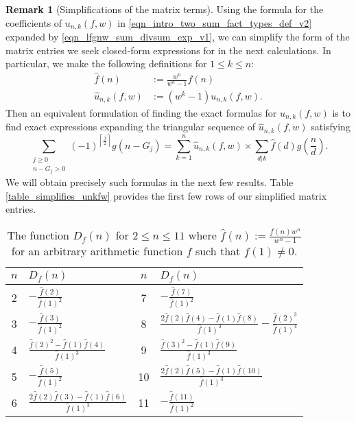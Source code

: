 \documentclass[12pt,reqno,a4letter]{article}
\numberwithin{figure}{section}
\numberwithin{table}{section}
\numberwithin{equation}{section}
\newcommand{\ceiling}[1]{\left\lceil #1 \right\rceil}
\theoremstyle{plain}
\numberwithin{theorem}{section}
\theoremstyle{definition}
\newtheorem{remark}[theorem]{Remark}
\begin{document}
\begin{remark}[Simplifications of the matrix terms] 
\label{remark_simplified_unkfw} 
Using the formula for the coefficients of $u_{n,k}(f, w)$ in 
\eqref{eqn_intro_two_sum_fact_types_def_v2} expanded by 
\eqref{eqn_lfgnw_sum_divsum_exp_v1}, we can simplify the 
form of the matrix entries we seek closed-form expressions for in the next 
calculations. In particular, we make the following definitions for 
$1 \leq k \leq n$: 
\begin{align*} 
\widehat{f}(n) & := \frac{w^n}{w^n-1} f(n) \\ 
\widehat{u}_{n,k}(f, w) & := (w^k - 1) u_{n,k}(f, w). 
\end{align*} 
Then an equivalent formulation of finding the exact formulas for $u_{n,k}(f, w)$ is 
to find exact expressions expanding the triangular sequence of 
$\widehat{u}_{n,k}(f, w)$ satisfying 
\[
\sum_{\substack{j \geq 0 \\ n-G_j > 0}} (-1)^{\ceiling{\frac{j}{2}}} g(n-G_j) = 
     \sum_{k=1}^{n} \widehat{u}_{n,k}(f, w) \times \sum_{d|k} 
     \widehat{f}(d) g\left(\frac{n}{d}\right). 
\] 
We will obtain precisely such formulas in the next few results. 
Table \ref{table_simplifies_unkfw} provides the first few rows of our 
simplified matrix entries. 
\end{remark} 


\begin{table}[ht!] 

\centering
\begin{tabular}{|c|l|c|l|} \hline 
$n$ & $D_f(n)$ & $n$ & $D_f(n)$ \\ \hline 
2 & $-\frac{\widehat{f}(2)}{\widehat{f}(1)^2}$ & 7 & 
    $-\frac{\widehat{f}(7)}{\widehat{f}(1)^2}$ \\ 
3 & $-\frac{\widehat{f}(3)}{\widehat{f}(1)^2}$ & 8 & 
    $\frac{2 \widehat{f}(2) \widehat{f}(4)-\widehat{f}(1)
    \widehat{f}(8)}{\widehat{f}(1)^3}-\frac{\widehat{f}(2)^3}{\widehat{f}(1)^4}$ \\ 
4 & $\frac{\widehat{f}(2)^2-\widehat{f}(1)
    \widehat{f}(4)}{\widehat{f}(1)^3}$ & 9 & 
    $\frac{\widehat{f}(3)^2-\widehat{f}(1) \widehat{f}(9)}{\widehat{f}(1)^3}$ \\ 
5 & $-\frac{\widehat{f}(5)}{\widehat{f}(1)^2}$ & 10 & 
    $\frac{2\widehat{f}(2) \widehat{f}(5)-\widehat{f}(1)
   \widehat{f}(10)}{\widehat{f}(1)^3}$ \\ 
6 & $\frac{2 \widehat{f}(2) \widehat{f}(3)-\widehat{f}(1)
    \widehat{f}(6)}{\widehat{f}(1)^3}$ & 11 & 
    $-\frac{\hat{f}(11)}{\hat{f}(1)^2}$ 
    \\ \hline 
\end{tabular} 

\bigskip 

\caption[The multiple convolution function $D_f(n)$]{
	 The function $D_f(n)$ for $2 \leq n \leq 11$ where 
	 $\widehat{f}(n) := \frac{f(n) w^n}{w^n-1}$ for an 
         arbitrary arithmetic function $f$ such that $f(1) \neq 0$.} 
\label{table_cases_of_Dn} 

\end{table} 
\end{document}
